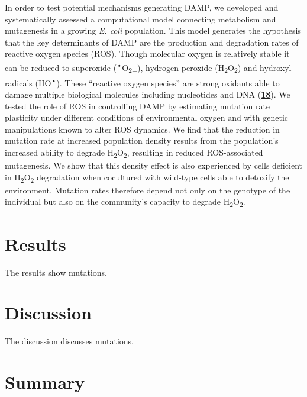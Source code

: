 \documentclass[
  12pt,
  letterpaper,
  DIV=11,
  numbers=noendperiod]{scrreprt}
\begin{document}
In order to test potential mechanisms generating DAMP, we developed and
systematically assessed a computational model connecting metabolism and
mutagenesis in a growing \emph{E. coli} population. This model generates
the hypothesis that the key determinants of DAMP are the production and
degradation rates of reactive oxygen species (ROS). Though molecular
oxygen is relatively stable it can be reduced to superoxide
(\textsuperscript{•}O\textsubscript{2−}), hydrogen peroxide
(H\textsubscript{2}O\textsubscript{2}) and hydroxyl radicals
(HO\textsuperscript{•}). These ``reactive oxygen species'' are strong
oxidants able to damage multiple biological molecules including
nucleotides and DNA
(\href{https://www.biorxiv.org/content/10.1101/2023.09.27.557722v1.full\#ref-18}{\textbf{18}}).
We tested the role of ROS in controlling DAMP by estimating mutation
rate plasticity under different conditions of environmental oxygen and
with genetic manipulations known to alter ROS dynamics. We find that the
reduction in mutation rate at increased population density results from
the population's increased ability to degrade
H\textsubscript{2}O\textsubscript{2}, resulting in reduced
ROS-associated mutagenesis. We show that this density effect is also
experienced by cells deficient in H\textsubscript{2}O\textsubscript{2}
degradation when cocultured with wild-type cells able to detoxify the
environment. Mutation rates therefore depend not only on the genotype of
the individual but also on the community's capacity to degrade
H\textsubscript{2}O\textsubscript{2}.


\hypertarget{results}{%
\chapter{Results}\label{results}}

The results show mutations.


\hypertarget{discussion}{%
\chapter{Discussion}\label{discussion}}

The discussion discusses mutations.


\hypertarget{summary}{%
\chapter{Summary}\label{summary}}
\end{document}
